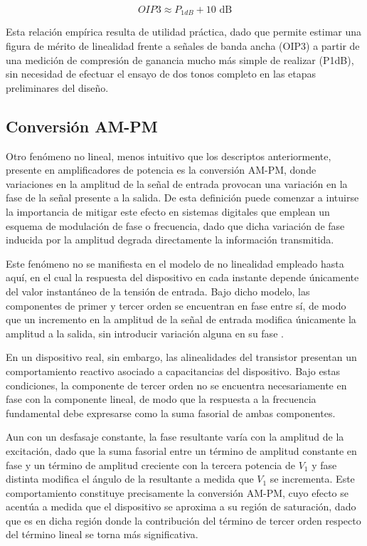 \begin{equation}
    OIP3 \approx P_{1dB} + 10 \text{ dB}
    \label{eq:oip3_p1db}
\end{equation}

Esta relación empírica resulta de utilidad práctica, dado que permite estimar una figura de mérito de linealidad frente a señales de banda ancha (OIP3) a partir de una medición de compresión de ganancia mucho más simple de realizar (P1dB), sin necesidad de efectuar el ensayo de dos tonos completo en las etapas preliminares del diseño.

\subsection{Conversión AM-PM}
Otro fenómeno no lineal, menos intuitivo que los descriptos anteriormente, presente en amplificadores de potencia es la conversión AM-PM, donde variaciones en la amplitud de la señal de entrada provocan una variación en la fase de la señal presente a la salida. De esta definición puede comenzar a intuirse la importancia de mitigar este efecto en sistemas digitales que emplean un esquema de modulación de fase o frecuencia, dado que dicha variación de fase inducida por la amplitud degrada directamente la información transmitida.

Este fenómeno no se manifiesta en el modelo de no linealidad empleado hasta aquí, en el cual la respuesta del dispositivo en cada instante depende únicamente del valor instantáneo de la tensión de entrada. Bajo dicho modelo, las componentes de primer y tercer orden se encuentran en fase entre sí, de modo que un incremento en la amplitud de la señal de entrada modifica únicamente la amplitud a la salida, sin introducir variación alguna en su fase \cite[pp.~15--16]{maas2003}.

En un dispositivo real, sin embargo, las alinealidades del transistor presentan un comportamiento reactivo asociado a capacitancias del dispositivo. Bajo estas condiciones, la componente de tercer orden no se encuentra necesariamente en fase con la componente lineal, de modo que la respuesta a la frecuencia fundamental debe expresarse como la suma fasorial de ambas componentes.

Aun con un desfasaje constante, la fase resultante varía con la amplitud de la excitación, dado que la suma fasorial entre un término de amplitud constante en fase y un término de amplitud creciente con la tercera potencia de $V_1$ y fase distinta modifica el ángulo de la resultante a medida que $V_1$ se incrementa. Este comportamiento constituye precisamente la conversión AM-PM, cuyo efecto se acentúa a medida que el dispositivo se aproxima a su región de saturación, dado que es en dicha región donde la contribución del término de tercer orden respecto del término lineal se torna más significativa.

